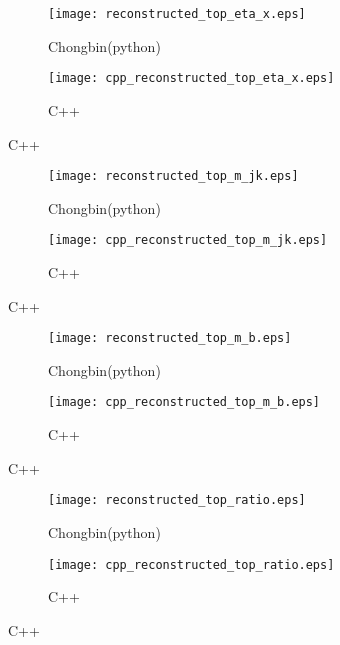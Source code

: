 \documentclass{beamer}
\begin{document}
\begin{frame}
  \begin{figure}[!h]
  \captionsetup[subfigure]{labelformat=empty}
  \begin{subfigure}{.5\textwidth}
  \centering
  \texttt{[image: reconstructed\_top\_eta\_x.eps]}
  \caption{Chongbin(python)}
  \end{subfigure} \hfill
  \begin{subfigure}{.5\textwidth}
  \centering
  \texttt{[image: cpp\_reconstructed\_top\_eta\_x.eps]}
  \caption{C++}
  \end{subfigure}
  \end{figure}
\end{frame}

\begin{frame}
  \begin{figure}[!h]
  \captionsetup[subfigure]{labelformat=empty}
  \begin{subfigure}{.5\textwidth}
  \centering
  \texttt{[image: reconstructed\_top\_m\_jk.eps]}
  \caption{Chongbin(python)}
  \end{subfigure} \hfill
  \begin{subfigure}{.5\textwidth}
  \centering
  \texttt{[image: cpp\_reconstructed\_top\_m\_jk.eps]}
  \caption{C++}
  \end{subfigure}
  \end{figure}
\end{frame}

\begin{frame}
  \begin{figure}[!h]
  \captionsetup[subfigure]{labelformat=empty}
  \begin{subfigure}{.5\textwidth}
  \centering
  \texttt{[image: reconstructed\_top\_m\_b.eps]}
  \caption{Chongbin(python)}
  \end{subfigure} \hfill
  \begin{subfigure}{.5\textwidth}
  \centering
  \texttt{[image: cpp\_reconstructed\_top\_m\_b.eps]}
  \caption{C++}
  \end{subfigure}
  \end{figure}
\end{frame}

\begin{frame}
  \begin{figure}[!h]
  \captionsetup[subfigure]{labelformat=empty}
  \begin{subfigure}{.5\textwidth}
  \centering
  \texttt{[image: reconstructed\_top\_ratio.eps]}
  \caption{Chongbin(python)}
  \end{subfigure} \hfill
  \begin{subfigure}{.5\textwidth}
  \centering
  \texttt{[image: cpp\_reconstructed\_top\_ratio.eps]}
  \caption{C++}
  \end{subfigure}
  \end{figure}
\end{frame}
\end{document}
